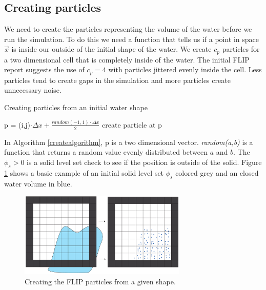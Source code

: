 \subsection{Creating particles}

We need to create the particles representing the volume of the water before we run the simulation. To do this we need a function that tells us if a point in space $\vec{x}$ is inside our outside of the initial shape of the water.  We create $c_p$ particles for a two dimensional cell that is completely inside of the water. The initial FLIP report suggests the use of $c_p = 4$ with particles jittered evenly inside the cell. Less particles tend to create gaps in the simulation and more particles create unnecessary noise. 

\begin{algorithm}
\caption{Creating particles from an initial water shape}
\begin{algorithmic}
\STATE p = (i,j)$\cdot \Delta x +\frac{random(-1,1) \cdot \Delta x}{2}$
\STATE create particle at p
\ENDIF
\ENDFOR
\ENDFOR
\ENDFOR
\end{algorithmic}
\label{createalgorithm}
\end{algorithm}
\noindent
In Algorithm \ref{createalgorithm}, p is a two dimensional vector. {\it random(a,b)} is a function that returns a random value evenly distributed between $a$ and $b$. The $\phi_s > 0$ is a solid level set check to see if the position is outside of the solid. Figure \ref{createexample} shows a basic example of an initial solid level set $\phi_s$ colored grey and an closed water volume in blue.

\begin{figure}[ht!]
\centering
\includegraphics[width=80mm]{img/create.pdf}
\caption{Creating the FLIP particles from a given shape.}
\label{createexample}
\end{figure}


